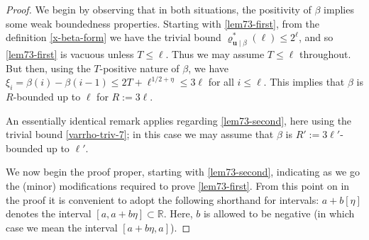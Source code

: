 \documentclass[11pt,reqno]{amsart}
\numberwithin{equation}{section}
\theoremstyle{definition}
\theoremstyle{remark}
\newcommand{\mbf}{\mathbf}
\renewcommand{\le}{\leqslant}
\newcommand\R{\mathbb{R}}
\begin{document}
\begin{proof} 
We begin by observing that in both situations, the positivity of $\beta$ implies some weak boundedness properties. Starting with \cref{lem73-first}, from the definition \cref{x-beta-form} we have the trivial bound $\varrho^*_{\mbf{u} \mid \beta}(\ell) \le 2^{\ell}$, and so \cref{lem73-first} is vacuous unless $T \le \ell$. Thus we may assume $T \le \ell$ throughout. But then, using the $T$-positive nature of $\beta$, we have $\xi_i = \beta(i) - \beta(i - 1) \le  2T + \ell^{1/2 + \eta}  \le 3\ell$ for all $i \le \ell$. This implies that $\beta$ is $R$-bounded up to $\ell$ for $R := 3\ell$.

An essentially identical remark applies regarding \cref{lem73-second}, here using the trivial bound \cref{varrho-triv-7}; in this case we may assume that $\beta$ is $R' := 3\ell'$-bounded up to $\ell'$. 

We now begin the proof proper, starting with \cref{lem73-second}, indicating as we go the (minor) modifications required to prove \cref{lem73-first}.  From this point on in the proof it is convenient to adopt the following shorthand for intervals: $a + b[\eta]$ denotes the interval $[a, a + b\eta] \subset \R$. Here, $b$ is allowed to be negative (in which case we mean the interval $[a + b\eta, a]$).



\end{proof}
\end{document}
